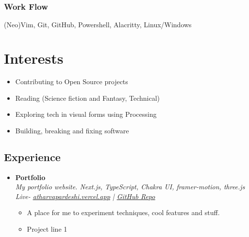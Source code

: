 \documentclass[11pt, oneside, a4paper, titlepage]{article}
\newcommand\experienceVSpace{\vspace{-0.1cm}}
\newcommand\skillsVSpace{\vspace{-0.3cm}}
\begin{document}
\begin{tcolorbox}
\begin{minipage}[t]{8cm}
\begin{tcolorbox}[grow to left by=0.6cm,colback=gray!25,colframe=white]
        \skillsVSpace
        \subsubsection{Work Flow}
        (Neo)Vim, Git, GitHub, Powershell, Alacritty, Linux/Windows

      \section*{Interests}
      \begin{itemize}
        \item{Contributing to Open Source projects}
        \item{Reading (Science fiction and Fantasy, Technical)}
        \item{Exploring tech in visual forms using Processing}
        \item{Building, breaking and fixing software}
      \end{itemize}
    \end{tcolorbox}
  \end{minipage}
  \begin{minipage}[t]{11cm}
    \vspace*{-0.5cm}
    \begin{tcolorbox}[grow to right by=0.75cm,colframe=white,colback=white]
      \section*{Experience}
      \begin{itemize}
        \item
        {
          \textbf{Portfolio} \\
          \textit{My portfolio website. Next.js, TypeScript, Chakra UI, framer-motion, three.js} \\
          \textit{Live- \href{https://atharvapardeshi.vercel.app}{\underline{atharvapardeshi.vercel.app}} | \href{https://github.com/SazedWorldbringer/portfolio}{\underline{GitHub Repo}}} \\
          \vspace*{-0.7cm}
          \begin{itemize}
            \item A place for me to experiment techniques, cool features and stuff.
              \experienceVSpace
            \item Project line 1
          \end{itemize}
        }


\end{itemize}
\end{tcolorbox}
\end{minipage}
\end{tcolorbox}
\end{document}
